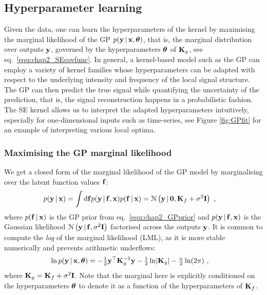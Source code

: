     \subsection{Hyperparameter learning} \label{subsec:chap2_hyperadaptation}
      Given the data, one can learn the hyperparameters of the kernel by
      maximising the marginal likelihood of the GP $p(\mathbf{y} \,|\, \mathbf{x},\boldsymbol{\theta})$, that
      is, the marginal distribution over outputs $\mathbf{y}$, governed by the
      hyperparameters $\boldsymbol{\theta}$ of $\mathbf{K}_y$, see eq.~\eqref{equ:chap2_SEcovfunc}.
      In general, a kernel-based model such as the GP can employ a variety of kernel families
      whose hyperparameters can be adapted with respect to the underlying intensity
      and frequency of the local signal structure. The GP can then predict the true signal while
      quantifying the uncertainty of the prediction, that is, the signal reconstruction happens in a probabilistic fashion.
      The SE kernel allows us to interpret the adapted hyperparameters
      intuitively, especially for one-dimensional inputs such as time-series,
      see Figure \ref{fig:GPfit} for an example of interpreting various local optima.

      \subsubsection{Maximising the GP marginal likelihood}
	We get a closed form of the marginal likelihood of the GP model by
	marginalising over the latent function values $\mathbf{f}$:
	\begin{align} \label{equ:chap2_marginal3}
	  p(\mathbf{y} \,|\, \mathbf{x}) &= \int \textrm{d}\mathbf{f} p(\mathbf{y} \,|\, \mathbf{f,x})p(\mathbf{f} \,|\, \mathbf{x})
	  = \mathcal{N} \left( \mathbf{y} \,|\, \mathbf{0}, \mathbf{K}_f + \sigma^2\mathbf{I} \right) ~,
	\end{align}
	where $p(\mathbf{f} \,|\, \mathbf{x})$ is the GP prior from eq.~\eqref{equ:chap2_GPprior}
	and $p(\mathbf{y} \,|\, \mathbf{f},\mathbf{x})$
	is the Gaussian likelihood
	$\mathcal{N} \left( \mathbf{y} \,|\,  \mathbf{f}, \sigma^2\mathbf{I} \right)$ factorised across the outputs $\mathbf{y}$.
	It is common to compute the \textit{log} of the marginal likelihood (LML), as it is
	more stable numerically and prevents arithmetic underflows:
	\begin{equation} \label{equ:chap2_NLML}
	  \begin{split}
	    \ln p(\mathbf{y} \,|\, \mathbf{x}, \boldsymbol{\theta})
	      &= -\tfrac{1}{2}\mathbf{y}^\top\mathbf{K}_y^{-1}\mathbf{y}-\tfrac{1}{2}\ln \lvert \mathbf{K}_y \rvert - \tfrac{n}{2} \ln(2\pi) ~,
	  \end{split}
	\end{equation}
	where $\mathbf{K}_y = \mathbf{K}_f + \sigma^2\mathbf{I}$.
	Note that the marginal here is explicitly conditioned on the hyperparameters $\boldsymbol{\theta}$ to
	denote it as a function of the hyperparameters of $\mathbf{K}_f$.

